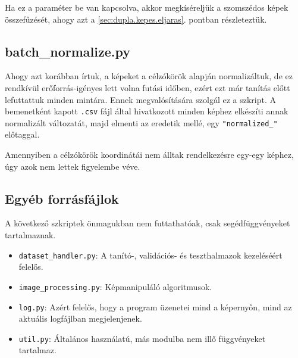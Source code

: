 
Ha ez a paraméter be van kapcsolva, akkor megkíséreljük a szomszédos képek összefűzését, ahogy azt
a \ref{sec:dupla.kepes.eljaras}. pontban részleteztük.


\subsection{batch\_normalize.py}

Ahogy azt korábban írtuk, a képeket a célzókörök alapján normalizáltuk, de ez rendkívül 
erőforrás-igényes lett volna futási időben, ezért ezt már tanítás előtt lefuttattuk minden
mintára. Ennek megvalósítására szolgál ez a szkript. A bemenetként kapott \texttt{.csv} 
fájl által hivatkozott minden képhez elkészíti annak normalizált változatát, majd elmenti
az eredetik mellé, egy \texttt{"normalized\_"} előtaggal.

Amennyiben a célzókörök koordinátái nem álltak rendelkezésre egy-egy képhez, úgy azok nem
lettek figyelembe véve.


\subsection{Egyéb forrásfájlok}

A következő szkriptek önmagukban nem futtathatóak, csak segédfüggvényeket tartalmaznak.

\begin{itemize}
\item 
	\texttt{dataset\_handler.py}: A tanító-, validációs- és teszthalmazok kezeléséért felelős.
\item 
	\texttt{image\_processing.py}: Képmanipuláló algoritmusok.
	
\item 
	\texttt{log.py}: Azért felelős, hogy a program üzenetei mind a képernyőn, mind 
	az aktuális logfájlban megjelenjenek.
\item 
	\texttt{util.py}: Általános használatú, más modulba nem illő függvényeket tartalmaz.
\end{itemize}


%
%

